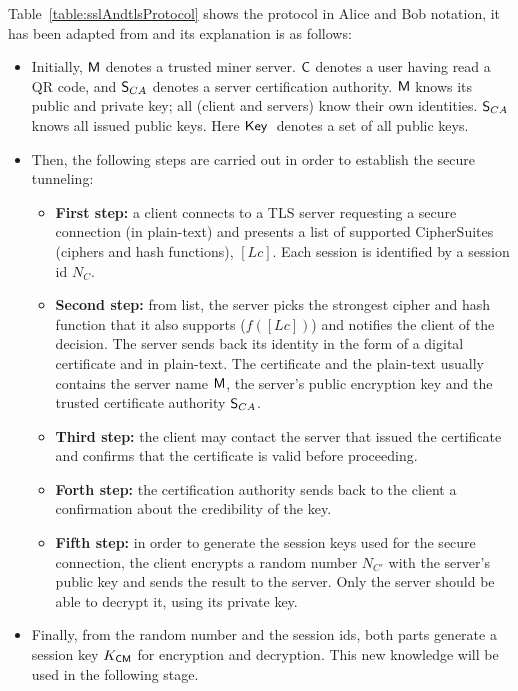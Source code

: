 Table~\ref{table:sslAndtlsProtocol} shows the protocol in Alice and Bob 
notation, it has been adapted from \cite{lopez13} and its explanation is as follows:
\begin{itemize}
  \item Initially, $\textsf{M}$ denotes a trusted miner server. $\textsf{C}$ denotes
    a user having read a QR code, and $\textsf{S}_{CA}$ denotes a server certification 
    authority. $\textsf{M}$ knows its public and private key; all (client and servers) 
    know their own identities. $\textsf{S}_{CA}$ knows all issued
    public keys. Here $\textsf{Key}\;$ denotes a set of all public keys.
  \item Then, the following steps are carried out in order to
    establish the secure tunneling:
    \begin{itemize}
    \item \textbf{First step:} a client connects to a TLS server
      requesting a secure connection (in plain-text) and presents a list
      of supported CipherSuites (ciphers and hash functions),
      $[Lc]$. Each session is identified by a session id $N_{C}$. 
    \item \textbf{Second step:} from list, the server picks the
      strongest cipher and hash function that it also supports
      ($f([Lc])$) and notifies the client of the decision. The server
      sends back its identity in the form of a digital certificate and
      in plain-text. The certificate and the plain-text usually contains
      the server name $\textsf{M}$, the server's public encryption
      key and the trusted certificate authority $\textsf{S}_{CA}$. 
    \item \textbf{Third step:} the client may contact the
      server that issued the certificate and confirms that the
      certificate is valid before proceeding.
    \item \textbf{Forth step:} the certification authority sends back to the 
      client a confirmation about the credibility of the key.
    \item \textbf{Fifth step:} in order to generate the session keys used for the
      secure connection, the client encrypts a random number $N_{C'}$
      with the server's public key and sends the result to the
      server. Only the server should be able to decrypt it, using its
      private key.  
    \end{itemize}
\item Finally, from the random number
  and the session ids, both parts generate a
  session key $K_{\textsf{C}\textsf{M}}$ for encryption and decryption. This new
  knowledge will be used in the following stage.  
\end{itemize}

